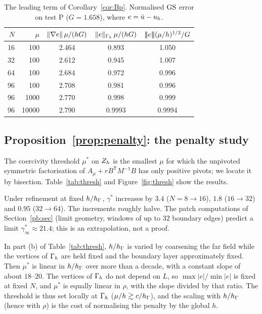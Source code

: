 \begin{table}[t]
\centering
\caption{The leading term of Corollary~\ref{cor:Bp}. Normalised $\mathrm{GS}$ error on test P ($G=1.658$), where $e=\tilde u-u_h$.}\label{tab:P}
\begin{tabular}{rrccc}
\toprule
$N$ & $\mu$ & $\lVert \nabla e\rVert\,\mu/(hG)$ & $\lVert e\rVert_{\Gamma_h}\,\mu/(hG)$ & $|\!|\!|e|\!|\!|(\mu/h)^{1/2}/G$\\
\midrule
16 & 100 & 2.464 & 0.893 & 1.050\\
32 & 100 & 2.612 & 0.945 & 1.007\\
64 & 100 & 2.684 & 0.972 & 0.996\\
96 & 100 & 2.708 & 0.981 & 0.996\\
96 & 1000 & 2.770 & 0.998 & 0.999\\
96 & 10000 & 2.790 & 0.9993 & 0.9994\\
\bottomrule
\end{tabular}
\end{table}

\subsection{Proposition~\ref{prop:penalty}: the penalty study}
The coercivity threshold $\mu^\ast$ on $Z_h$ is the smallest $\mu$ for which the unpivoted symmetric factorisation of $A_\mu+rB^{\mathsf T}M^{-1}B$ has only positive pivots; we locate it by bisection. Table~\ref{tab:thresh} and Figure~\ref{fig:thresh} show the results.

Under refinement at fixed $h/h_\Gamma$, $\gamma^\ast$ increases by $3.4$ ($N=8\to16$), $1.8$ ($16\to32$) and $0.95$ ($32\to64$). The increments roughly halve. The patch computations of Section~\ref{pb:sec} (limit geometry, windows of up to $32$ boundary edges) predict a limit $\gamma^\ast_\infty\approx21.4$; this is an extrapolation, not a proof.

In part (b) of Table~\ref{tab:thresh}, $h/h_\Gamma$ is varied by coarsening the far field while the vertices of $\Gamma_h$ are held fixed and the boundary layer approximately fixed. Then $\mu^\ast$ is linear in $h/h_\Gamma$ over more than a decade, with a constant slope of about $18$--$20$. The vertices of $\Gamma_h$ do not depend on $L$, so $\max|e|/\min|e|$ is fixed at fixed $N$, and $\mu^\ast$ is equally linear in $\rho$, with the slope divided by that ratio. The threshold is thus set locally at $\Gamma_h$ ($\mu/h\gtrsim c/h_\Gamma$), and the scaling with $h/h_\Gamma$ (hence with $\rho$) is the cost of normalising the penalty by the global $h$.


